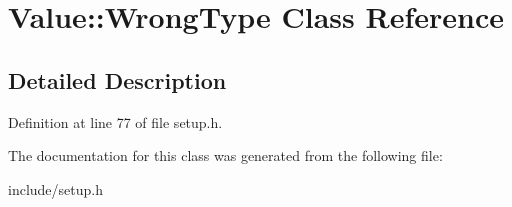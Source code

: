 \hypertarget{classValue_1_1WrongType}{\section{Value\-:\-:Wrong\-Type Class Reference}
\label{classValue_1_1WrongType}
}


\subsection{Detailed Description}


Definition at line 77 of file setup.\-h.



The documentation for this class was generated from the following file\-:\begin{DoxyCompactItemize}
\item 
include/setup.\-h\end{DoxyCompactItemize}
